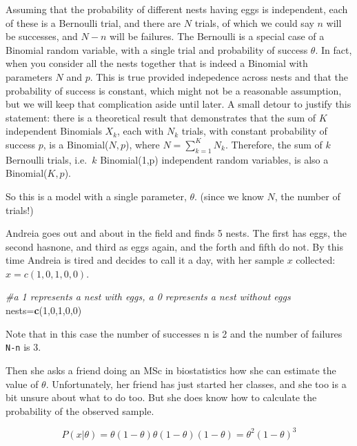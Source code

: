 \documentclass[
]{book}
\newenvironment{Shaded}{\begin{snugshade}}{\end{snugshade}}
\newcommand{\CommentTok}[1]{\textcolor[rgb]{0.56,0.35,0.01}{\textit{#1}}}
\newcommand{\DecValTok}[1]{\textcolor[rgb]{0.00,0.00,0.81}{#1}}
\newcommand{\FunctionTok}[1]{\textcolor[rgb]{0.13,0.29,0.53}{\textbf{#1}}}
\newcommand{\NormalTok}[1]{#1}
\newcommand{\OtherTok}[1]{\textcolor[rgb]{0.56,0.35,0.01}{#1}}
\begin{document}
Assuming that the probability of different nests having eggs is independent, each of these is a Bernoulli trial, and there are \(N\) trials, of which we could say \(n\) will be successes, and \(N-n\) will be failures. The Bernoulli is a special case of a Binomial random variable, with a single trial and probability of success \(\theta\). In fact, when you consider all the nests together that is indeed a Binomial with parameters \(N\) and \(p\). This is true provided indepedence across nests and that the probability of success is constant, which might not be a reasonable assumption, but we will keep that complication aside until later. A small detour to justify this statement: there is a theoretical result that demonstrates that the sum of \(K\) independent Binomials \(X_k\), each with \(N_k\) trials, with constant probability of success \(p\), is a Binomial(\(N,p\)), where \(N=\sum_{k=1}^K N_k\). Therefore, the sum of \(k\) Bernoulli trials, i.e.~\(k\) Binomial(1,p) independent random variables, is also a Binomial(\(K,p\)).

So this is a model with a single parameter, \(\theta\). (since we know \(N\), the number of trials!)

Andreia goes out and about in the field and finds 5 nests. The first has eggs, the second hasnone, and third as eggs again, and the forth and fifth do not. By this time Andreia is tired and decides to call it a day, with her sample \(x\) collected: \(x=c(1,0,1,0,0)\).

\begin{Shaded}
\begin{Highlighting}[]
\CommentTok{\#a 1 represents a nest with eggs, a 0 represents a nest without eggs}
\NormalTok{nests}\OtherTok{=}\FunctionTok{c}\NormalTok{(}\DecValTok{1}\NormalTok{,}\DecValTok{0}\NormalTok{,}\DecValTok{1}\NormalTok{,}\DecValTok{0}\NormalTok{,}\DecValTok{0}\NormalTok{)}
\end{Highlighting}
\end{Shaded}

Note that in this case the number of successes n is 2 and the number of failures \texttt{N-n} is 3.

Then she asks a friend doing an MSc in biostatistics how she can estimate the value of \(\theta\). Unfortunately, her friend has just started her classes, and she too is a bit unsure about what to do too. But she does know how to calculate the probability of the observed sample.

\[P(x|\theta)=\theta (1-\theta) \theta (1-\theta)  (1-\theta)=\theta^2 (1-\theta)^3\]
\end{document}
